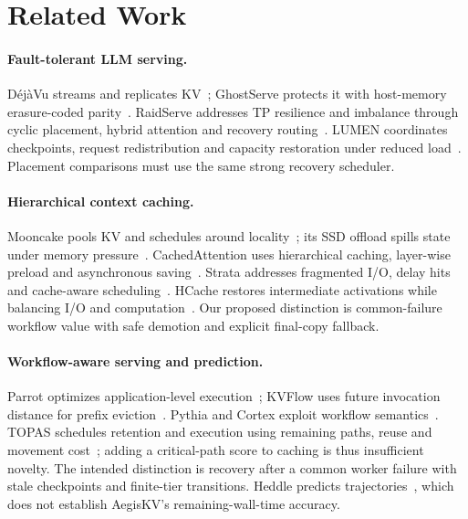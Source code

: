 \documentclass[sigplan,10pt,anonymous,nonacm]{acmart}
\begin{document}
\FloatBarrier

\section{Related Work}
\label{sec:related}

\paragraph{Fault-tolerant LLM serving.}
D\'ej\`aVu streams and replicates KV~\cite{strati2024dejavu}; GhostServe
protects it with host-memory erasure-coded parity~\cite{jayakody2026ghostserve}.
RaidServe addresses TP resilience and imbalance through cyclic placement,
hybrid attention and recovery routing~\cite{xu2026raidserve}. LUMEN
coordinates checkpoints, request redistribution and capacity restoration
under reduced load~\cite{cao2026lumen}. Placement comparisons must use the same strong recovery scheduler.

\paragraph{Hierarchical context caching.}
Mooncake pools KV and schedules around locality~\cite{qin2025mooncake};
its SSD offload spills state under memory pressure~\cite{mooncake2026ssdoffload}.
CachedAttention uses hierarchical caching, layer-wise preload and
asynchronous saving~\cite{gao2024cachedattention}. Strata addresses
fragmented I/O, delay hits and cache-aware scheduling~\cite{xie2026strata}.
HCache restores intermediate activations while balancing I/O and
computation~\cite{gao2025hcache}. Our proposed distinction is common-failure workflow value
with safe demotion and explicit final-copy fallback.

\paragraph{Workflow-aware serving and prediction.}
Parrot optimizes application-level execution~\cite{lin2024parrot}; KVFlow
uses future invocation distance for prefix eviction~\cite{pan2025kvflow}.
Pythia and Cortex exploit workflow semantics~\cite{yu2026pythia,pagonas2025cortex}.
TOPAS schedules retention and execution using remaining paths, reuse and
movement cost~\cite{ni2026topas}; adding a critical-path score to caching
is thus insufficient novelty. The intended distinction is recovery after
a common worker failure with stale checkpoints and finite-tier transitions.
Heddle predicts trajectories~\cite{zhang2026heddle}, which does not establish
AegisKV's remaining-wall-time accuracy.
\end{document}
